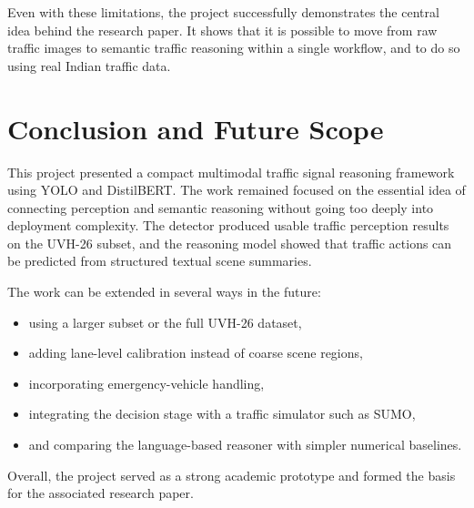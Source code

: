 \documentclass[12pt,a4paper]{report}
\begin{document}
Even with these limitations, the project successfully demonstrates the central idea behind the research paper. It shows that it is possible to move from raw traffic images to semantic traffic reasoning within a single workflow, and to do so using real Indian traffic data.

\chapter{Conclusion and Future Scope}
This project presented a compact multimodal traffic signal reasoning framework using YOLO and DistilBERT. The work remained focused on the essential idea of connecting perception and semantic reasoning without going too deeply into deployment complexity. The detector produced usable traffic perception results on the UVH-26 subset, and the reasoning model showed that traffic actions can be predicted from structured textual scene summaries.

The work can be extended in several ways in the future:
\begin{itemize}[leftmargin=1.5cm]
\item using a larger subset or the full UVH-26 dataset,
\item adding lane-level calibration instead of coarse scene regions,
\item incorporating emergency-vehicle handling,
\item integrating the decision stage with a traffic simulator such as SUMO,
\item and comparing the language-based reasoner with simpler numerical baselines.
\end{itemize}

Overall, the project served as a strong academic prototype and formed the basis for the associated research paper.
\end{document}
